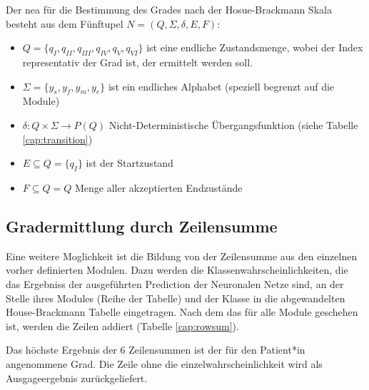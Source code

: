 Der \ac{nea} für die Bestimmung des Grades nach der Hosue-Brackmann Skala besteht aus dem Fünftupel $N = (Q, \Sigma, \delta, E, F)$:

\begin{itemize}
  \setlength\itemsep{-0.5em}
\item $Q=\{ q_I, q_{II}, q_{III}, q_{IV}, q_{V}, q_{VI} \}$  ist eine endliche Zustandsmenge, wobei der Index representativ der Grad ist, der ermittelt werden soll.
\item $\Sigma=\{ y_s, y_f, y_m, y_e \}$ ist ein endliches Alphabet (speziell begrenzt auf die Module)
\item $\delta:Q \times \Sigma \rightarrow P(Q)$ Nicht-Deterministische Übergangsfunktion (siehe Tabelle \ref{cap:transition})
\item $E \subseteq Q = \{ q_I \}$ ist der Startzustand
\item $F \subseteq Q = Q$ Menge aller akzeptierten Endzustände
\end{itemize}





\subsection{Gradermittlung durch Zeilensumme}\label{rowsum}
Eine weitere Moglichkeit ist die Bildung von der Zeilensumme aus den einzelnen vorher definierten Modulen. Dazu werden die Klassenwahrscheinlichkeiten, die das Ergebniss der ausgeführten Prediction der Neuronalen Netze sind, an der Stelle ihres Modules (Reihe der Tabelle) und der Klasse in die abgewandelten House-Brackmann Tabelle eingetragen. Nach dem das für alle Module geschehen ist, werden die Zeilen addiert (Tabelle \ref{cap:rowsum}).

Das höchste Ergebnis der 6 Zeilensummen ist der für den Patient*in angenommene Grad. Die Zeile ohne die einzelwahrscheinlichkeit wird als Ausgageergebnis zurückgeliefert.

